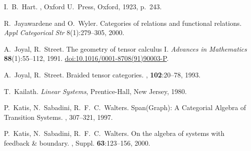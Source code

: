 \begin{thebibliography}{RSW00}

    I.\ B.\ Hart.
    , Oxford U.\ Press,
    Oxford, 1923, p.\ 243.


    R.\ Jayawardene and O.\ Wyler.
    \newblock Categories of relations and functional relations.
    \newblock \emph{Appl Categorical Str} 8(1):279--305, 2000.

    A.\ Joyal, R.\ Street.
    \newblock The geometry of tensor calculus I.
    \newblock \emph{Advances in Mathematics} {\bf 88}(1):55--112, 1991.
    \newblock \href{http://doi.org/10.1016/0001-8708(91)90003-P}{doi:10.1016/0001-8708(91)90003-P}.

    A.\ Joyal, R.\ Street.
    \newblock Braided tensor categories.
    , {\bf 102}:20--78, 1993.

    T.\ Kailath.
    \newblock \emph{Linear Systems}, Prentice-Hall, New Jersey, 1980.

    P.\ Katis, N.\ Sabadini, R.\ F.\ C.\ Walters.
    \newblock Span(Graph): A Categorial Algebra of Transition Systems.
    , 307--321, 1997. 

    P.\ Katis, N.\ Sabadini, R.\ F.\ C.\ Walters.
    \newblock On the algebra of systems with feedback \& boundary.
    ,
    Suppl. {\bf 63}:123--156, 2000.




\end{thebibliography}
